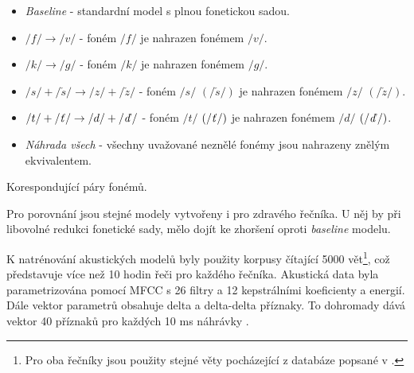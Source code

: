 \begin{itemize}
  \item \textit{Baseline} - standardní model s plnou fonetickou sadou.
  \item $/f/ \rightarrow /v/$ - foném $/f/$ je nahrazen fonémem $/v/$.
  \item $/k/ \rightarrow /g/$ - foném $/k/$ je nahrazen fonémem $/g/$.
  \item $/s/+/\check{s}/ \rightarrow /z/+/\check{z}/$ - foném $/s/$ $\left(/\check{s}/\right)$ je nahrazen fonémem $/z/$ $\left(/\check{z}/\right)$.
  \item $/t/+/\text{\textit{ť}}/ \rightarrow /d/+/\text{\textit{ď}}/$ - foném $/t/$ $\left(/\text{\textit{ť}}/\right)$ je nahrazen fonémem $/d/$ $\left(/\text{\textit{ď}}/\right)$.
  \item \textit{Náhrada všech} - všechny uvažované neznělé fonémy jsou nahrazeny znělým ekvivalentem.
\end{itemize}

\begin{table}[htpb]
  \centering
  \def\arraystretch{1.5}
  \caption{Korespondující páry fonémů.}
  \label{tab:construction:reduction:pairs}
\end{table}

\noindent Pro porovnání jsou stejné modely vytvořeny i pro zdravého řečníka. U něj by při libovolné redukci fonetické sady, mělo dojít ke zhoršení oproti \textit{baseline} modelu.

K natrénování akustických modelů byly použity korpusy čítající 5000 vět\footnote{Pro oba řečníky jsou použity stejné věty pocházející z databáze popsané v \cite{Radova2000}.}, což představuje více než 10 hodin řeči pro každého řečníka. Akustická data byla parametrizována pomocí MFCC s 26 filtry a 12 kepstrálními koeficienty a energií. Dále vektor parametrů obsahuje delta a delta-delta příznaky. To dohromady dává vektor 40 příznaků pro každých 10 ms náhrávky \cite{Psutka2007}.

